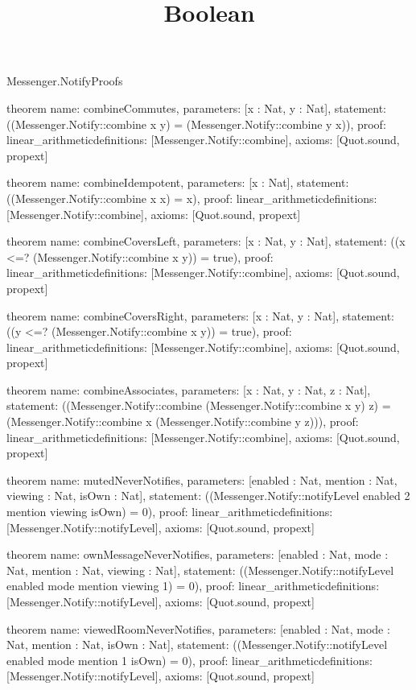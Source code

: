 \begin{lexlean}{Messenger.NotifyProofs}
\title{Boolean}
\begin{semanticmodule}
theorem{
  name: combineCommutes,
  parameters: [x : Nat, y : Nat],
  statement: ((Messenger.Notify::combine x y) = (Messenger.Notify::combine y x)),
  proof: linear_arithmetic{definitions: [Messenger.Notify::combine]},
  axioms: [Quot.sound, propext]
}

theorem{
  name: combineIdempotent,
  parameters: [x : Nat],
  statement: ((Messenger.Notify::combine x x) = x),
  proof: linear_arithmetic{definitions: [Messenger.Notify::combine]},
  axioms: [Quot.sound, propext]
}

theorem{
  name: combineCoversLeft,
  parameters: [x : Nat, y : Nat],
  statement: ((x <=? (Messenger.Notify::combine x y)) = true),
  proof: linear_arithmetic{definitions: [Messenger.Notify::combine]},
  axioms: [Quot.sound, propext]
}

theorem{
  name: combineCoversRight,
  parameters: [x : Nat, y : Nat],
  statement: ((y <=? (Messenger.Notify::combine x y)) = true),
  proof: linear_arithmetic{definitions: [Messenger.Notify::combine]},
  axioms: [Quot.sound, propext]
}

theorem{
  name: combineAssociates,
  parameters: [x : Nat, y : Nat, z : Nat],
  statement: ((Messenger.Notify::combine (Messenger.Notify::combine x y) z) = (Messenger.Notify::combine x (Messenger.Notify::combine y z))),
  proof: linear_arithmetic{definitions: [Messenger.Notify::combine]},
  axioms: [Quot.sound, propext]
}

theorem{
  name: mutedNeverNotifies,
  parameters: [enabled : Nat, mention : Nat, viewing : Nat, isOwn : Nat],
  statement: ((Messenger.Notify::notifyLevel enabled 2 mention viewing isOwn) = 0),
  proof: linear_arithmetic{definitions: [Messenger.Notify::notifyLevel]},
  axioms: [Quot.sound, propext]
}

theorem{
  name: ownMessageNeverNotifies,
  parameters: [enabled : Nat, mode : Nat, mention : Nat, viewing : Nat],
  statement: ((Messenger.Notify::notifyLevel enabled mode mention viewing 1) = 0),
  proof: linear_arithmetic{definitions: [Messenger.Notify::notifyLevel]},
  axioms: [Quot.sound, propext]
}

theorem{
  name: viewedRoomNeverNotifies,
  parameters: [enabled : Nat, mode : Nat, mention : Nat, isOwn : Nat],
  statement: ((Messenger.Notify::notifyLevel enabled mode mention 1 isOwn) = 0),
  proof: linear_arithmetic{definitions: [Messenger.Notify::notifyLevel]},
  axioms: [Quot.sound, propext]
}


\end{semanticmodule}
\end{lexlean}
